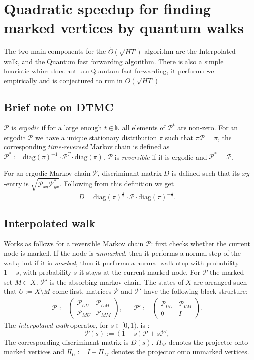 \documentclass{article}
\newcommand{\diag}[1]{\mathrm{diag}\left( #1 \right)}
\newcommand{\N}{\mathbb{N}}
\newcommand{\PM}{\mathcal{P}}
\begin{document}
\section{Quadratic speedup for finding marked vertices by quantum walks}
The two main components for the $\tilde{O}(\sqrt{HT})$  algorithm are the Interpolated walk, and the Quantum fast forwarding algorithm. There is also a simple heuristic which does not use Quantum fast forwarding, it performs well empirically and is conjectured to run in $O(\sqrt{HT})$ 
\subsection{Brief note on DTMC}
$\PM$ is \emph{ergodic} if for a large enough $t\in \N$ all elements of $\PM^t$ are non-zero. For an ergodic $\PM$ we have a unique stationary distribution $\pi$ such that $\pi\PM = \pi$, the corresponding \emph{time-reversed} Markov chain is defined as $\PM^*:=\diag{\pi}^{-1}\cdot\PM^T\cdot\diag{\pi}$.  $\PM$ is \emph{reversible} if it is ergodic and $\PM^*=\PM$.

For an ergodic Markov chain $\PM$, discriminant matrix $D$ is defined such that its $xy$-entry is $\sqrt{\PM_{xy}\PM^*_{yx}}$. Following from this definition we get
\begin{equation}\label{eq:discriminant}
D=\diag{\pi}^{\frac12}\cdot\PM\cdot\diag{\pi}^{-\frac12}.
\end{equation}
\subsection{Interpolated walk}
Works as follows for a reversible Markov chain $\PM$: first checks whether the current node is marked. If the node is \emph{unmarked}, then it performs a normal step of the walk; but if it is \emph{marked}, then it performs a normal walk step with probability $1-s$, with probability $s$ it stays at the current marked node. For $\PM$ the marked set $M\subset X$. 
$\PM'$ is the absorbing markov chain.
The states of $X$ are arranged such that $U := X \setminus M$ come first, matrices $\PM$ and $\PM'$ have the following block structure:
\begin{align*}
\PM :=\left(\begin{array}{cc} \PM_{UU} & \PM_{UM} \\ \PM_{MU} & \PM_{MM} \end{array}\right), & &
\PM' :=\left(\begin{array}{cc} \PM_{UU} & \PM_{UM} \\ 0 & I \end{array}\right).
\end{align*}
The \emph{interpolated walk} operator, for $s\in [0,1)$, is :
\begin{equation}\label{eq:interpolChainDef}
\PM(s):=(1 - s)\PM + s\PM',
\end{equation}
The corresponding discriminant matrix is $D(s)$. $\Pi_M$ denotes the projector onto marked vertices and $\Pi_U:=I-\Pi_M$ denotes the projector onto unmarked vertices. 
\end{document}
